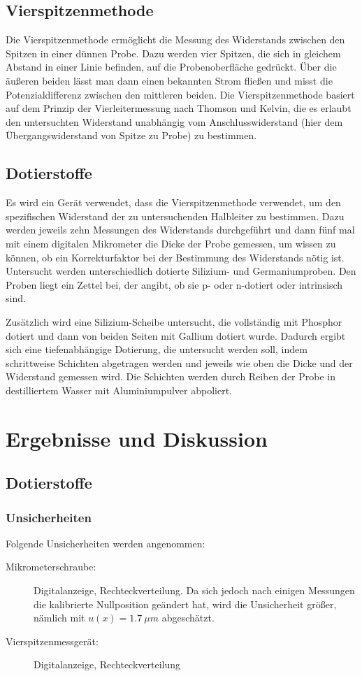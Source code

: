 \documentclass[
	a4paper,
	12pt,
	pagesize,
	ngerman
]{scrartcl}
\begin{document}
	\subsection{Vierspitzenmethode}
	Die Vierspitzenmethode ermöglicht die Messung des Widerstands zwischen den Spitzen in einer dünnen Probe.
	Dazu werden vier Spitzen, die sich in gleichem Abstand in einer Linie befinden, auf die Probenoberfläche gedrückt.
	Über die äußeren beiden lässt man dann einen bekannten Strom fließen und misst die Potenzialdifferenz zwischen den mittleren beiden.
	Die Vierspitzenmethode basiert auf dem Prinzip der Vierleitermessung nach Thomson und Kelvin, die es erlaubt den untersuchten Widerstand unabhängig vom Anschlusswiderstand (hier dem Übergangswiderstand von Spitze zu Probe) zu bestimmen.

	\subsection{Dotierstoffe}
	Es wird ein Gerät verwendet, dass die Vierspitzenmethode verwendet, um den spezifischen Widerstand der zu untersuchenden Halbleiter zu bestimmen.
	Dazu werden jeweils zehn Messungen des Widerstands durchgeführt und dann fünf mal mit einem digitalen Mikrometer die Dicke der Probe gemessen, um wissen zu können, ob ein Korrekturfaktor bei der Bestimmung des Widerstands nötig ist.
	Untersucht werden unterschiedlich dotierte Silizium- und Germaniumproben.
	Den Proben liegt ein Zettel bei, der angibt, ob sie p- oder n-dotiert oder intrinsisch sind.

	Zusätzlich wird eine Silizium-Scheibe untersucht, die vollständig mit Phosphor dotiert und dann von beiden Seiten mit Gallium dotiert wurde.
	Dadurch ergibt sich eine tiefenabhängige Dotierung, die untersucht werden soll, indem schrittweise Schichten abgetragen werden und jeweils wie oben die Dicke und der Widerstand gemessen wird.
	Die Schichten werden durch Reiben der Probe in destilliertem Wasser mit Aluminiumpulver abpoliert.

	\section{Ergebnisse und Diskussion}

	\subsection{Dotierstoffe}
	\subsubsection{Unsicherheiten}
	Folgende Unsicherheiten werden angenommen:
	\begin{description}
		\item[Mikrometerschraube:]  Digitalanzeige, Rechteckverteilung. Da sich jedoch nach einigen Messungen die kalibrierte Nullposition geändert hat, wird die Unsicherheit größer, nämlich mit $u(x)=\SI{1.7}{\mu m}$ abgeschätzt.
		\item[Vierspitzenmessgerät:] Digitalanzeige, Rechteckverteilung
	\end{description}
\end{document}
